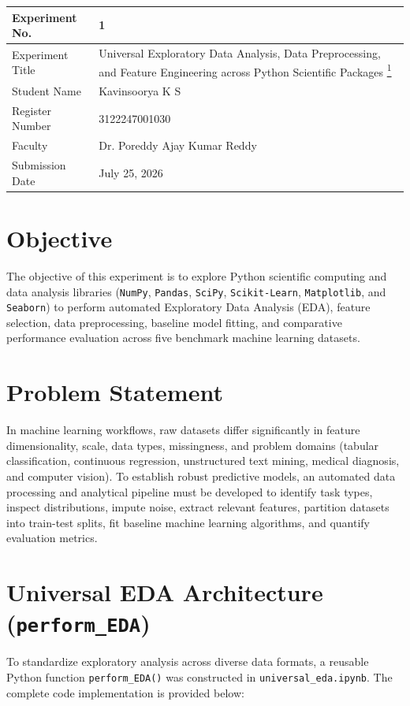 \documentclass[12pt,a4paper]{article}
\begin{document}
\begin{tabular}{|p{4cm}|p{11cm}|}
\hline
Experiment No. & 1 \\ \hline
Experiment Title & Universal Exploratory Data Analysis, Data Preprocessing, and Feature Engineering across Python Scientific Packages \href{https://github.com/Kavin-ks/Machine-Learning-Projects}{\textsuperscript{1}}\\ \hline
Student Name & Kavinsoorya K S \\ \hline
Register Number & 3122247001030 \\ \hline
Faculty & Dr. Poreddy Ajay Kumar Reddy \\ \hline
Submission Date & July 25, 2026 \\ \hline
\end{tabular}

\vspace{0.5cm}

\section{Objective}
The objective of this experiment is to explore Python scientific computing and data analysis libraries (\texttt{NumPy}, \texttt{Pandas}, \texttt{SciPy}, \texttt{Scikit-Learn}, \texttt{Matplotlib}, and \texttt{Seaborn}) to perform automated Exploratory Data Analysis (EDA), feature selection, data preprocessing, baseline model fitting, and comparative performance evaluation across five benchmark machine learning datasets.

\section{Problem Statement}
In machine learning workflows, raw datasets differ significantly in feature dimensionality, scale, data types, missingness, and problem domains (tabular classification, continuous regression, unstructured text mining, medical diagnosis, and computer vision). To establish robust predictive models, an automated data processing and analytical pipeline must be developed to identify task types, inspect distributions, impute noise, extract relevant features, partition datasets into train-test splits, fit baseline machine learning algorithms, and quantify evaluation metrics.

\section{Universal EDA Architecture (\texttt{perform\_EDA})}
To standardize exploratory analysis across diverse data formats, a reusable Python function \texttt{perform\_EDA()} was constructed in \texttt{universal\_eda.ipynb}. The complete code implementation is provided below:
\end{document}
